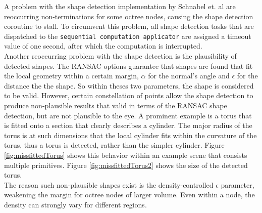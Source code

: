 A problem with the shape detection implementation by Schnabel et. al\cite{schnabel-2007-software} are reoccurring non-terminations for some octree nodes, causing the shape detection coroutine to stall. To circumvent this problem, all shape detection tasks that are dispatched to the \verb|sequential computation applicator| are assigned a timeout value of one second, after which the computation is interrupted. 
\\
Another reoccurring problem with the shape detection is the plausibility of detected shapes. The RANSAC options guarantee that shapes are found that fit the local geometry within a certain margin, $\alpha$ for the normal's angle and $\epsilon$ for the distance the the shape. So within theses two parameters, the shape is considered to be valid. However, certain constellation of points allow the shape detection to produce non-plausible results that valid in terms of the RANSAC shape detection, but are not plausible to the eye. A prominent example is a torus that is fitted onto a section that clearly describes a cylinder. The major radius of the torus is at such dimensions that the local cylinder fits within the curvature of the torus, thus a torus is detected, rather than the simpler cylinder. Figure \ref{fig:missfittedTorus} shows this behavior within an example scene that consists multiple primitives. Figure \ref{fig:missfittedTorus2} shows the size of the detected torus. 
\\
The reason such non-plausible shapes exist is the density-controlled $\epsilon$ parameter, weakening the margin for octree nodes of larger volume. Even within a node, the density can strongly vary for different regions. 

